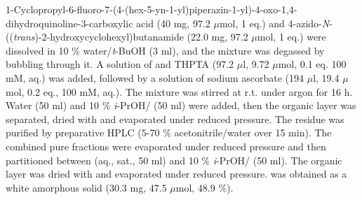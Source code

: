 {1-Cyclopropyl-6-fluoro-7-(4-(hex-5-yn-1-yl)piperazin-1-yl)-4-oxo-1,4\hyp{}dihydro\-quinoline-3-carboxylic acid  (40 mg, 97.2 $\mu$mol, 1 eq.) and 4\hyp{}azido\hyp{}\textit{N}\hyp{}((\textit{trans})\hyp{}2\hyp{}hydroxycyclohexyl)butanamide   (22.0 mg, 97.2 $\mu$mol, 1 eq.) were dissolved in 10 \% water/\textit{t}-BuOH (3 ml), and the mixture was degassed by bubbling  through it. 
A solution of  and THPTA (97.2 $\mu$l, 9.72 $\mu$mol, 0.1 eq. 100 mM, aq.) was added, followed by a solution of sodium ascorbate (194 $\mu$l, 19.4 $\mu$mol, 0.2 eq., 100 mM, aq.). 
The mixture was stirred at r.t. under argon for 16 h. Water (50 ml) and 10 \% \textit{i}-PrOH/ (50 ml) were added, then the organic layer was separated, dried with  and evaporated under reduced pressure. The residue was purified by preparative HPLC (5-70 \% acetonitrile/water over 15 min). 
The combined pure fractions were evaporated under reduced pressure and then partitioned between  (aq., sat., 50 ml) and 10 \% \textit{i}-PrOH/ (50 ml). The organic layer was dried with  and evaporated under reduced pressure.
 was obtained as a white amorphous solid (30.3 mg, 47.5 $\mu$mol, 48.9 \%).
\\[1\baselineskip]
\\[1\baselineskip]
}
